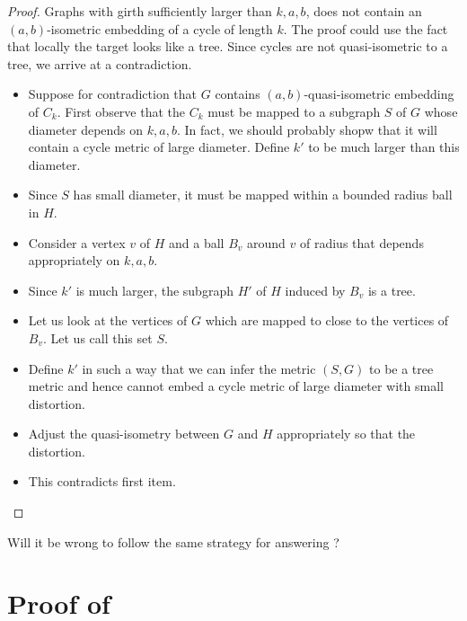 \documentclass[a4paper]{article}
\begin{document}
\begin{proof}
	Graphs with girth sufficiently larger than $k,a,b$, does not contain an $(a,b)$-isometric embedding of a cycle of length $k$. 
	The proof could use the fact that locally the target looks like a tree. Since cycles are not quasi-isometric to a tree, we arrive at a contradiction.
	
	\begin{itemize}
		
		\item Suppose for contradiction that $G$ contains $(a,b)$-quasi-isometric embedding of $C_k$.  First observe that the $C_k$ must be mapped to a subgraph $S$ of $G$ whose diameter depends on $k,a,b$. In fact, we should probably shopw that it will contain a cycle metric of large diameter.  Define $k'$ to be much larger than this diameter. 
		
		\item Since $S$ has small diameter, it must be mapped within a bounded radius ball in $H$.
		  
		\item Consider a vertex $v$ of $H$ and a ball $B_v$ around $v$ of radius that depends appropriately on $k,a,b$. 
		
		\item Since $k'$ is much larger, the subgraph $H'$ of $H$ induced by $B_v$ is a tree. 
		
		\item Let us look at the vertices of $G$ which are mapped to close to the vertices of $B_v$. Let us call this set $S$.
		
		\item Define $k'$ in such a way that we can infer the metric $(S,G)$ to be a tree metric and hence cannot embed a cycle metric of large diameter with small distortion.
		
		\item Adjust the quasi-isometry between $G$ and $H$ appropriately so that the distortion.
		\item This contradicts first item. 
	\end{itemize}
\end{proof}


Will it be wrong to follow the same strategy for answering ?

\newpage 

\section{Proof of }
\end{document}
